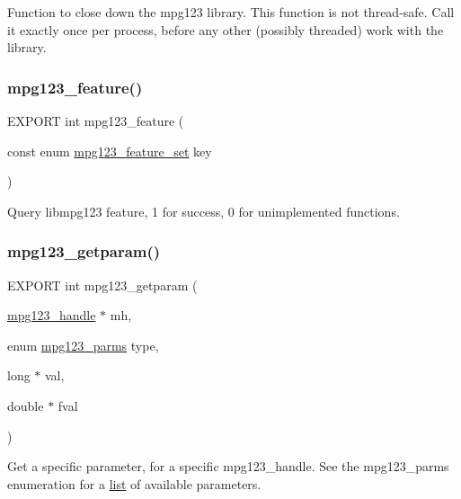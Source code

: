 Function to close down the mpg123 library. This function is not thread-\/safe. Call it exactly once per process, before any other (possibly threaded) work with the library. \mbox{\label{group__mpg123__init_ga1f2d38c15bd586f625e24dab1d7710e9}} 
\subsubsection{\texorpdfstring{mpg123\+\_\+feature()}{mpg123\_feature()}}
{\footnotesize\ttfamily E\+X\+P\+O\+RT int mpg123\+\_\+feature (\begin{DoxyParamCaption}\item[{const enum \hyperlink{group__mpg123__init_gab26f1b8c3289847f5928176a20b4c942}{mpg123\+\_\+feature\+\_\+set}}]{key }\end{DoxyParamCaption})}

Query libmpg123 feature, 1 for success, 0 for unimplemented functions. \mbox{\label{group__mpg123__init_ga7d8cc88f00db97b26aa237a53f6179fe}} 
\subsubsection{\texorpdfstring{mpg123\+\_\+getparam()}{mpg123\_getparam()}}
{\footnotesize\ttfamily E\+X\+P\+O\+RT int mpg123\+\_\+getparam (\begin{DoxyParamCaption}\item[{\hyperlink{group__mpg123__init_ga6728e2839a395f3a07d4514da659faca}{mpg123\+\_\+handle} $\ast$}]{mh,  }\item[{enum \hyperlink{group__mpg123__init_ga73a8ff3363028b89afc72b3ea032b9cb}{mpg123\+\_\+parms}}]{type,  }\item[{long $\ast$}]{val,  }\item[{double $\ast$}]{fval }\end{DoxyParamCaption})}

Get a specific parameter, for a specific mpg123\+\_\+handle. See the mpg123\+\_\+parms enumeration for a \hyperlink{protocollist-p}{list} of available parameters. \mbox{\label{group__mpg123__init_ga2d00303745f1e30a8ffedd2c63d94183}} 
